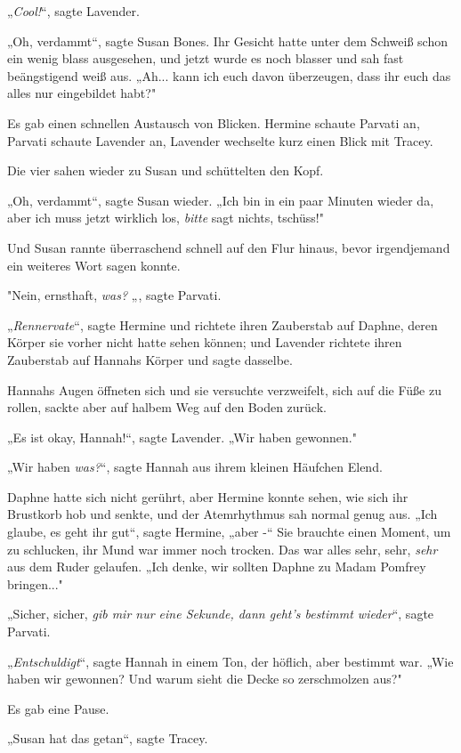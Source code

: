 {„\emph{Cool!}“, sagte Lavender.

„Oh, verdammt“, sagte Susan Bones. Ihr Gesicht hatte unter dem Schweiß schon ein wenig blass ausgesehen, und jetzt wurde es noch blasser und sah fast beängstigend weiß aus. „Ah... kann ich euch davon überzeugen, dass ihr euch das alles nur eingebildet habt?"

Es gab einen schnellen Austausch von Blicken. Hermine schaute Parvati an, Parvati schaute Lavender an, Lavender wechselte kurz einen Blick mit Tracey.

Die vier sahen wieder zu Susan und schüttelten den Kopf.

„Oh, verdammt“, sagte Susan wieder. „Ich bin in ein paar Minuten wieder da, aber ich muss jetzt wirklich los, \emph{bitte} sagt nichts, tschüss!"

Und Susan rannte überraschend schnell auf den Flur hinaus, bevor irgendjemand ein weiteres Wort sagen konnte.

"Nein, ernsthaft, \emph{was?} „, sagte Parvati.

„\emph{Rennervate}“, sagte Hermine und richtete ihren Zauberstab auf Daphne, deren Körper sie vorher nicht hatte sehen können; und Lavender richtete ihren Zauberstab auf Hannahs Körper und sagte dasselbe.

Hannahs Augen öffneten sich und sie versuchte verzweifelt, sich auf die Füße zu rollen, sackte aber auf halbem Weg auf den Boden zurück.

„Es ist okay, Hannah!“, sagte Lavender. „Wir haben gewonnen."

„Wir haben \emph{was?}“, sagte Hannah aus ihrem kleinen Häufchen Elend.

Daphne hatte sich nicht gerührt, aber Hermine konnte sehen, wie sich ihr Brustkorb hob und senkte, und der Atemrhythmus sah normal genug aus. „Ich glaube, es geht ihr gut“, sagte Hermine, „aber -“ Sie brauchte einen Moment, um zu schlucken, ihr Mund war immer noch trocken. Das war alles sehr, sehr, \emph{sehr} aus dem Ruder gelaufen. „Ich denke, wir sollten Daphne zu Madam Pomfrey bringen..."

„Sicher, sicher, \emph{gib mir nur eine Sekunde, dann geht's bestimmt wieder}“, sagte Parvati.

„\emph{Entschuldigt}“, sagte Hannah in einem Ton, der höflich, aber bestimmt war. „Wie haben wir gewonnen? Und warum sieht die Decke so zerschmolzen aus?"

Es gab eine Pause.

„Susan hat das getan“, sagte Tracey.

}
